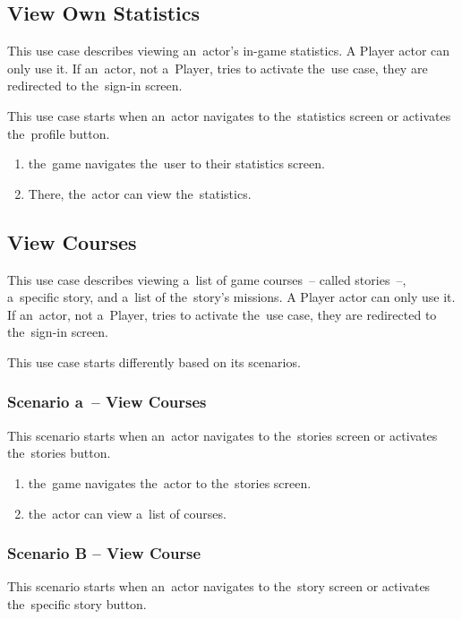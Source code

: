 \subsection{View Own Statistics}

This use case describes viewing an~actor's in-game statistics.
A Player actor can only use it.
If an~actor, not a~Player, tries to activate the~use case, they are redirected to the~sign-in screen.

This use case starts when an~actor navigates to the~statistics screen or activates the~profile button.

\begin{enumerate}
    \item the~game navigates the~user to their statistics screen.
    \item There, the~actor can view the~statistics.
\end{enumerate}

\pagebreak
\subsection{View Courses}

This use case describes viewing a~list of game courses~-- called stories~--, a~specific story, and a~list of the~story's missions.
A Player actor can only use it.
If an~actor, not a~Player, tries to activate the~use case, they are redirected to the~sign-in screen.

This use case starts differently based on its scenarios.

\subsubsection*{Scenario a~-- View Courses}

This scenario starts when an~actor navigates to the~stories screen or activates the~stories button.

\begin{enumerate}
    \item the~game navigates the~actor to the~stories screen.
    \item the~actor can view a~list of courses.
\end{enumerate}

\subsubsection*{Scenario B -- View Course}

This scenario starts when an~actor navigates to the~story screen or activates the~specific story button.

